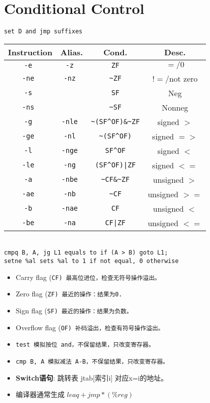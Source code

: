 \section{Conditional Control}
\begin{center}
    \tt{set D} and \tt{jmp} suffixes 
    \begin{tabular}{| c || c | c | c |}
        \hline
        \textbf{Instruction} & \textbf{Alias.} & \textbf{Cond.} & \textbf{Desc.} \\ \hline
        \tt{-e} & \tt{-z} & \verb|ZF| & $=/0$ \\ \hline
        \tt{-ne} & \tt{-nz} & \verb|~ZF| & $!=$/not zero \\ \hline
        \tt{-s} &  & \verb|SF| & Neg \\ \hline
        \tt{-ns} &  & \verb|~SF| & Nonneg \\ \hline
        \tt{-g} & \tt{-nle} & \verb|~(SF^OF)&~ZF| & signed $>$ \\ \hline
        \tt{-ge} & \tt{-nl} & \verb|~(SF^OF)| & signed $=>$ \\ \hline
        \tt{-l} & \tt{-nge} & \verb|SF^OF| & signed $<$ \\ \hline
        \tt{-le} & \tt{-ng} & \verb=(SF^OF)|ZF= & signed $<=$ \\ \hline
        \tt{-a} & \tt{-nbe} & \verb|~CF&~ZF| & unsigned $>$ \\ \hline
        \tt{-ae} & \tt{-nb} & \verb|~CF| & unsigned $>=$ \\ \hline
        \tt{-b} & \tt{-nae} & \verb|CF| & unsigned $<$ \\ \hline
        \tt{-be} & \tt{-na} & \verb=CF|ZF= & unsigned $<=$ \\ \hline
    \end{tabular} \\
    \tt{cmpq B, A},  \tt{jg L1} equals to \tt{if (A > B) goto L1;} \\
    \tt{setne \%al} sets \tt{\%al} to 1 if not equal, 0 otherwise \\
\end{center}

\begin{itemize}[nosep]
    \item Carry flag (\tt{CF}) 最高位进位，检查无符号操作溢出。
    \item Zero flag (\tt{ZF}) 最近的操作：结果为0.
    \item Sign flag (\tt{SF}) 最近的操作：结果为负数。
    \item Overflow flag (\tt{OF}) 补码溢出，检查有符号操作溢出。
    \item \tt{test} 模拟按位 \tt{and}，不保留结果，只改变寄存器。
    \item \tt{cmp B, A} 模拟减法 \tt{A-B}，不保留结果，只改变寄存器。
    \item \textbf{Switch语句}: 跳转表 jtab[索引i] 对应x=i的地址。
    \item 编译器通常生成 $leaq + jmp *(\%reg)$

\end{itemize}
